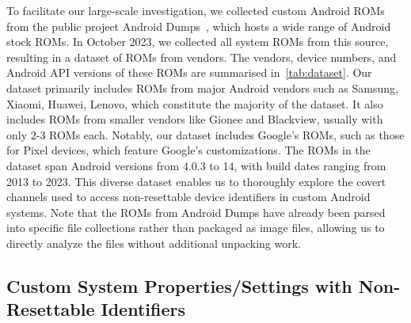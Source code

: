 To facilitate our large-scale investigation, we collected custom Android ROMs from the public project Android Dumps~\cite{android_dumps}, which hosts a wide range of Android stock ROMs.
In October 2023, we collected all system ROMs from this source, resulting in a dataset of \datasetsize ROMs from \totalbrand vendors.
The vendors, device numbers, and Android API versions of these ROMs are summarised in~\autoref{tab:dataset}.
Our dataset primarily includes ROMs from major Android vendors such as Samsung, Xiaomi, Huawei, Lenovo, 
which constitute the majority of the dataset.
It also includes ROMs from smaller vendors like Gionee and Blackview, usually with only 2-3 ROMs each.
Notably, our dataset includes Google’s ROMs, such as those for Pixel devices, which feature Google's customizations. 
The ROMs in the dataset span Android versions from 4.0.3 to 14, with build dates ranging from 2013 to 2023.
This diverse dataset enables us to thoroughly explore the covert channels used to access non-resettable device identifiers in custom Android systems.
Note that the ROMs from Android Dumps have already been parsed into specific file collections rather than packaged as image files, allowing us to directly analyze the files without additional unpacking work. 

\subsection{Custom System Properties/Settings with Non-Resettable Identifiers}
\label{sec:staticresult}


